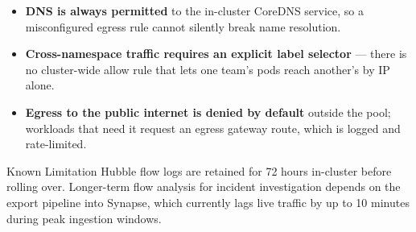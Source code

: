 \begin{itemize}[itemsep=2pt]
  \item \textbf{DNS is always permitted} to the in-cluster CoreDNS service, so a misconfigured egress rule cannot silently break name resolution.
  \item \textbf{Cross-namespace traffic requires an explicit label selector} --- there is no cluster-wide allow rule that lets one team's pods reach another's by IP alone.
  \item \textbf{Egress to the public internet is denied by default} outside the  pool; workloads that need it request an egress gateway route, which is logged and rate-limited.
\end{itemize}

\begin{warningbox}{Known Limitation}
Hubble flow logs are retained for 72 hours in-cluster before rolling over. Longer-term flow analysis for incident investigation depends on the export pipeline into Synapse, which currently lags live traffic by up to 10 minutes during peak ingestion windows.
\end{warningbox}
